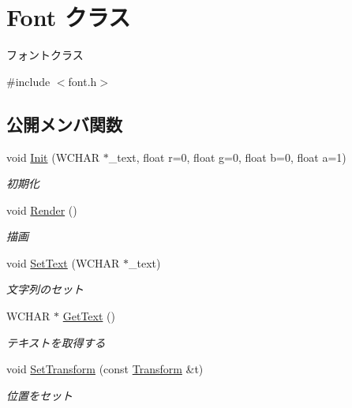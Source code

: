 \hypertarget{class_font}{}\section{Font クラス}
\label{class_font}


フォントクラス  




{\ttfamily \#include $<$font.\+h$>$}

\subsection*{公開メンバ関数}
\begin{DoxyCompactItemize}
\item 
void \mbox{\hyperlink{class_font_a89cf4ba6fb0d3105b1207146e85661c0}{Init}} (W\+C\+H\+AR $\ast$\+\_\+text, float r=0, float g=0, float b=0, float a=1)
\begin{DoxyCompactList}\small\item\em 初期化 \end{DoxyCompactList}\item 
void \mbox{\hyperlink{class_font_ad0e36f0066cc8724b6cf6833a15aedbc}{Render}} ()
\begin{DoxyCompactList}\small\item\em 描画 \end{DoxyCompactList}\item 
void \mbox{\hyperlink{class_font_a2c862120802e9aac650a96f7b4e29081}{Set\+Text}} (W\+C\+H\+AR $\ast$\+\_\+text)
\begin{DoxyCompactList}\small\item\em 文字列のセット \end{DoxyCompactList}\item 
W\+C\+H\+AR $\ast$ \mbox{\hyperlink{class_font_a47be569e73a4ba819bf4370463cf929b}{Get\+Text}} ()
\begin{DoxyCompactList}\small\item\em テキストを取得する \end{DoxyCompactList}\item 
void \mbox{\hyperlink{class_font_a46354f2c8dfd91268242b44e337d5262}{Set\+Transform}} (const \mbox{\hyperlink{class_transform}{Transform}} \&t)
\begin{DoxyCompactList}\small\item\em 位置をセット \end{DoxyCompactList}\end{DoxyCompactItemize}


